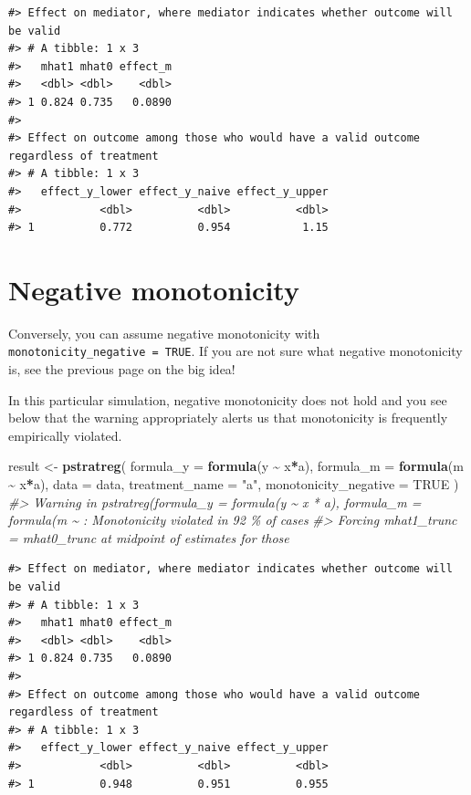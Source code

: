 \documentclass[
]{book}
\newenvironment{Shaded}{\begin{snugshade}}{\end{snugshade}}
\newcommand{\AttributeTok}[1]{\textcolor[rgb]{0.13,0.29,0.53}{#1}}
\newcommand{\CommentTok}[1]{\textcolor[rgb]{0.56,0.35,0.01}{\textit{#1}}}
\newcommand{\ConstantTok}[1]{\textcolor[rgb]{0.56,0.35,0.01}{#1}}
\newcommand{\FunctionTok}[1]{\textcolor[rgb]{0.13,0.29,0.53}{\textbf{#1}}}
\newcommand{\NormalTok}[1]{#1}
\newcommand{\OtherTok}[1]{\textcolor[rgb]{0.56,0.35,0.01}{#1}}
\newcommand{\SpecialCharTok}[1]{\textcolor[rgb]{0.81,0.36,0.00}{\textbf{#1}}}
\newcommand{\StringTok}[1]{\textcolor[rgb]{0.31,0.60,0.02}{#1}}
\begin{document}
\begin{verbatim}
#> Effect on mediator, where mediator indicates whether outcome will be valid
#> # A tibble: 1 x 3
#>   mhat1 mhat0 effect_m
#>   <dbl> <dbl>    <dbl>
#> 1 0.824 0.735   0.0890
#> 
#> Effect on outcome among those who would have a valid outcome regardless of treatment
#> # A tibble: 1 x 3
#>   effect_y_lower effect_y_naive effect_y_upper
#>            <dbl>          <dbl>          <dbl>
#> 1          0.772          0.954           1.15
\end{verbatim}

\hypertarget{negative-monotonicity}{%
\section{Negative monotonicity}\label{negative-monotonicity}}

Conversely, you can assume negative monotonicity with \texttt{monotonicity\_negative\ =\ TRUE}. If you are not sure what negative monotonicity is, see the previous page on the big idea!

In this particular simulation, negative monotonicity does not hold and you see below that the warning appropriately alerts us that monotonicity is frequently empirically violated.

\begin{Shaded}
\begin{Highlighting}[]
\NormalTok{result }\OtherTok{\textless{}{-}} \FunctionTok{pstratreg}\NormalTok{(}
  \AttributeTok{formula\_y =} \FunctionTok{formula}\NormalTok{(y }\SpecialCharTok{\textasciitilde{}}\NormalTok{ x}\SpecialCharTok{*}\NormalTok{a),}
  \AttributeTok{formula\_m =} \FunctionTok{formula}\NormalTok{(m }\SpecialCharTok{\textasciitilde{}}\NormalTok{ x}\SpecialCharTok{*}\NormalTok{a),}
  \AttributeTok{data =}\NormalTok{ data,}
  \AttributeTok{treatment\_name =} \StringTok{"a"}\NormalTok{,}
  \AttributeTok{monotonicity\_negative =} \ConstantTok{TRUE}
\NormalTok{)}
\CommentTok{\#\textgreater{} Warning in pstratreg(formula\_y = formula(y \textasciitilde{} x * a), formula\_m = formula(m \textasciitilde{} : Monotonicity violated in 92 \% of cases}
\CommentTok{\#\textgreater{} Forcing mhat1\_trunc = mhat0\_trunc at midpoint of estimates for those}
\end{Highlighting}
\end{Shaded}

\begin{verbatim}
#> Effect on mediator, where mediator indicates whether outcome will be valid
#> # A tibble: 1 x 3
#>   mhat1 mhat0 effect_m
#>   <dbl> <dbl>    <dbl>
#> 1 0.824 0.735   0.0890
#> 
#> Effect on outcome among those who would have a valid outcome regardless of treatment
#> # A tibble: 1 x 3
#>   effect_y_lower effect_y_naive effect_y_upper
#>            <dbl>          <dbl>          <dbl>
#> 1          0.948          0.951          0.955
\end{verbatim}
\end{document}
